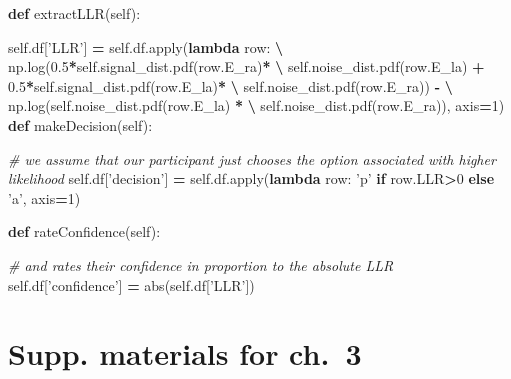 \documentclass[12pt,twoside]{reedthesis}
\newenvironment{Shaded}{\begin{snugshade}}{\end{snugshade}}
\newcommand{\BuiltInTok}[1]{#1}
\newcommand{\CommentTok}[1]{\textcolor[rgb]{0.56,0.35,0.01}{\textit{#1}}}
\newcommand{\ControlFlowTok}[1]{\textcolor[rgb]{0.13,0.29,0.53}{\textbf{#1}}}
\newcommand{\DecValTok}[1]{\textcolor[rgb]{0.00,0.00,0.81}{#1}}
\newcommand{\FloatTok}[1]{\textcolor[rgb]{0.00,0.00,0.81}{#1}}
\newcommand{\KeywordTok}[1]{\textcolor[rgb]{0.13,0.29,0.53}{\textbf{#1}}}
\newcommand{\NormalTok}[1]{#1}
\newcommand{\OperatorTok}[1]{\textcolor[rgb]{0.81,0.36,0.00}{\textbf{#1}}}
\newcommand{\StringTok}[1]{\textcolor[rgb]{0.31,0.60,0.02}{#1}}
\newcommand{\VariableTok}[1]{\textcolor[rgb]{0.00,0.00,0.00}{#1}}
\begin{document}
\begin{Shaded}
\begin{Highlighting}[]
    \KeywordTok{def}\NormalTok{ extractLLR(}\VariableTok{self}\NormalTok{):}
        
        \VariableTok{self}\NormalTok{.df[}\StringTok{'LLR'}\NormalTok{] }\OperatorTok{=} \VariableTok{self}\NormalTok{.df.}\BuiltInTok{apply}\NormalTok{(}\KeywordTok{lambda}\NormalTok{ row: }\OperatorTok{\textbackslash{}}
\NormalTok{                            np.log(}\FloatTok{0.5}\OperatorTok{*}\VariableTok{self}\NormalTok{.signal_dist.pdf(row.E_ra)}\OperatorTok{*} \OperatorTok{\textbackslash{}}
                            \VariableTok{self}\NormalTok{.noise_dist.pdf(row.E_la) }\OperatorTok{+} 
                            \FloatTok{0.5}\OperatorTok{*}\VariableTok{self}\NormalTok{.signal_dist.pdf(row.E_la)}\OperatorTok{*} \OperatorTok{\textbackslash{}}
                            \VariableTok{self}\NormalTok{.noise_dist.pdf(row.E_ra)) }\OperatorTok{-} \OperatorTok{\textbackslash{}}
\NormalTok{                            np.log(}\VariableTok{self}\NormalTok{.noise_dist.pdf(row.E_la) }\OperatorTok{*} \OperatorTok{\textbackslash{}}
                            \VariableTok{self}\NormalTok{.noise_dist.pdf(row.E_ra)), axis}\OperatorTok{=}\DecValTok{1}\NormalTok{)}
    \KeywordTok{def}\NormalTok{ makeDecision(}\VariableTok{self}\NormalTok{):}
        
        \CommentTok{# we assume that our participant just chooses the option associated with higher likelihood}
        \VariableTok{self}\NormalTok{.df[}\StringTok{'decision'}\NormalTok{] }\OperatorTok{=}  \VariableTok{self}\NormalTok{.df.}\BuiltInTok{apply}\NormalTok{(}\KeywordTok{lambda}\NormalTok{ row: }\StringTok{'p'} \ControlFlowTok{if}\NormalTok{ row.LLR}\OperatorTok{>}\DecValTok{0} \ControlFlowTok{else} \StringTok{'a'}\NormalTok{, axis}\OperatorTok{=}\DecValTok{1}\NormalTok{)}
        
    \KeywordTok{def}\NormalTok{ rateConfidence(}\VariableTok{self}\NormalTok{):}
        
        \CommentTok{# and rates their confidence in proportion to the absolute LLR}
        \VariableTok{self}\NormalTok{.df[}\StringTok{'confidence'}\NormalTok{] }\OperatorTok{=} \BuiltInTok{abs}\NormalTok{(}\VariableTok{self}\NormalTok{.df[}\StringTok{'LLR'}\NormalTok{])}
\end{Highlighting}
\end{Shaded}
\hypertarget{supp.-materials-for-ch.-3}{%
\chapter{Supp. materials for ch.~3}\label{supp.-materials-for-ch.-3}}
\end{document}
